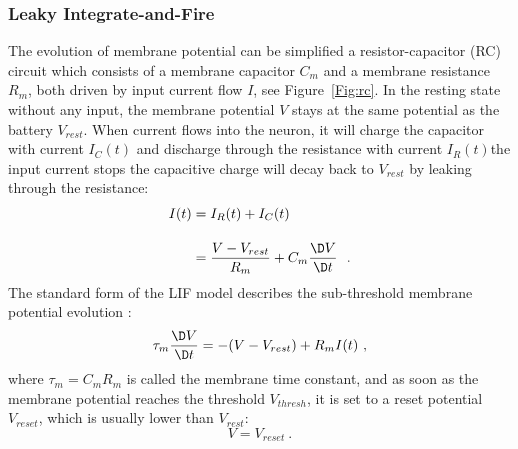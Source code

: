 \subsubsection{Leaky Integrate-and-Fire\DIFaddbegin {}\DIFaddend }
The evolution of membrane potential \DIFaddbegin {}\DIFaddend can be simplified \DIFdelbegin {}\DIFdelend \DIFaddbegin {}\DIFaddend a resistor-capacitor (RC) circuit which consists of a membrane capacitor \DIFdelbegin \DIFdel{, }\DIFdelend $C_m$ and a membrane resistance $R_m$, both driven by \DIFaddbegin {}\DIFaddend input current flow $I$, see Figure~\ref{Fig:rc}.
In the resting state without any input, the membrane potential $V$ stays at the same potential as the battery $V_{rest}$.
When current flows into the neuron, it will charge the capacitor with current $I_C(t)$ and discharge through the resistance with current $I_R(t)$\DIFdelbegin {}\DIFdelend \DIFaddbegin {}\DIFaddend the input current stops \DIFdelbegin {}\DIFdelend the capacitive charge will decay back to $V_{rest}$ by leaking through the resistance:
\begin{equation}
\begin{aligned}
	I(t) &= I_R(t) + I_C(t) \\[10pt]
	&= \dfrac{V-V_{rest}}{R_m} + C_m \dfrac{\D V}{\D t}~~.
\end{aligned}
\label{equ:LIF_current}
\end{equation}
The standard form of the LIF model describes the sub-threshold membrane potential evolution \DIFaddbegin {}\DIFaddend :
\begin{equation}
	\tau_m \dfrac{\D V}{\D t} = -(V-V_{rest}) + R_m I(t)~,
\end{equation}
where $\tau_m = C_m R_m$ is called the membrane time constant, and as soon as the membrane potential reaches the threshold $V_{thresh}$, it is set to a reset potential $V_{reset}$, which is usually lower than $V_{rest}$: 
\begin{equation}
V = V_{reset}~.
\end{equation}

